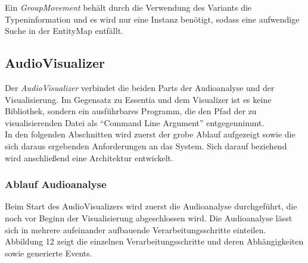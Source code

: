 \documentclass[11pt,a4paper]{article}
\begin{document}
Ein \textit{GroupMovement} behält durch die Verwendung des Variants die Typeninformation und es wird nur eine Instanz benötigt, sodass eine aufwendige Suche in der EntityMap entfällt.

\newpage
\subsection{AudioVisualizer}
Der \textit{AudioVisualizer} verbindet die beiden Parts der Audioanalyse und der Visualisierung. Im Gegensatz zu Essentia und dem Visualizer ist es keine Bibliothek, sondern ein ausführbares Programm, die den Pfad der zu visualisierenden Datei als ``Command Line Argument'' entgegennimmt.\\
In den folgenden Abschnitten wird zuerst der grobe Ablauf aufgezeigt sowie die sich daraus ergebenden Anforderungen an das System. Sich darauf beziehend wird anschließend eine Architektur entwickelt.

\subsubsection{Ablauf Audioanalyse}
Beim Start des AudioVisualizers wird zuerst die Audioanalyse durchgeführt, die noch vor Beginn der Visualisierung abgeschlossen wird. Die Audioanalyse lässt sich in mehrere aufeinander aufbauende Verarbeitungsschritte einteilen. Abbildung 12 zeigt die einzelnen Verarbeitungsschritte und deren Abhängigkeiten sowie generierte Events.
\end{document}
